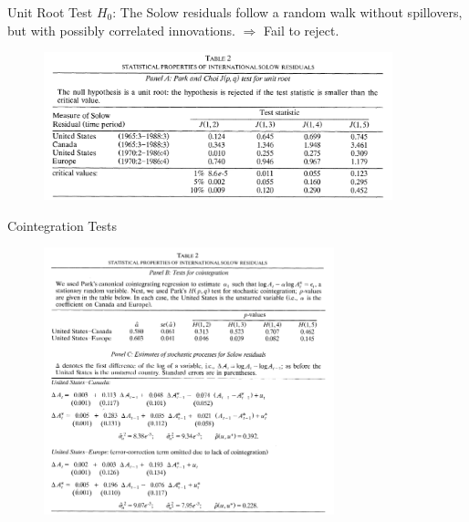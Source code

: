 \documentclass[10pt]{beamer}
\begin{document}
\begin{frame}{Unit Root Test}
$H_0$: The Solow residuals follow a random walk without spillovers, but with possibly correlated innovations. $\Rightarrow$ Fail to reject.
\begin{figure}[thbp]
  \centering
  \includegraphics[width=0.90\textwidth]{4.png}
\end{figure}
\end{frame}

\begin{frame}{Cointegration Tests}
\begin{figure}[thbp]
  \centering
  \includegraphics[width=0.75\textwidth]{5.png}
\end{figure}
\end{frame}
\end{document}
